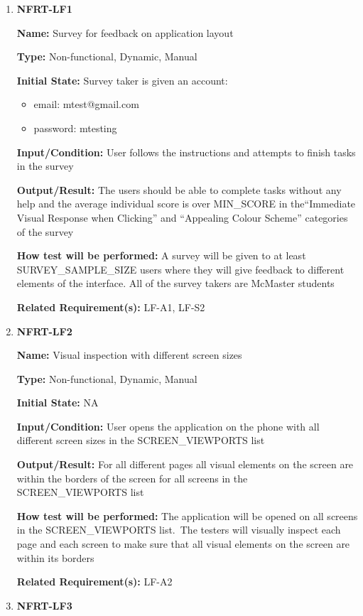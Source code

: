 \documentclass[12pt, titlepage]{article}
\begin{document}
\begin{enumerate}
\item{\textbf{NFRT-LF1}}

\textbf{Name:} Survey for feedback on application layout

\textbf{Type:} Non-functional, Dynamic, Manual
					
\textbf{Initial State:} Survey taker is given an account:
\begin{itemize}
\item email: mtest@gmail.com
\item password: mtesting
\end{itemize}

\textbf{Input/Condition:} User follows the instructions and attempts to finish tasks in the survey 
					
\textbf{Output/Result:} The users should be able to complete tasks without any help and the average individual score is over MIN\_SCORE in the``Immediate Visual Response when Clicking'' and ``Appealing Colour Scheme'' categories of the survey
					
\textbf{How test will be performed:} A survey will be given to at least
SURVEY\_SAMPLE\_SIZE users where they will give feedback to different elements of the interface. All of the survey takers are McMaster students

\textbf{Related Requirement(s):} LF-A1, LF-S2

\item{\textbf{NFRT-LF2}}

\textbf{Name:} Visual inspection with different screen sizes

\textbf{Type:} Non-functional, Dynamic, Manual
					
\textbf{Initial State:} NA
					
\textbf{Input/Condition:} User opens the application on the phone with all different screen sizes in the SCREEN\_VIEWPORTS list

\textbf{Output/Result:} For all different pages all visual elements on the screen are within the borders of the screen for all screens in the SCREEN\_VIEWPORTS list

\textbf{How test will be performed:} The application will be opened on all screens in the SCREEN\_VIEWPORTS list.\
The testers will visually inspect each page and each screen to make sure that all visual elements on the screen are within its borders

\textbf{Related Requirement(s):} LF-A2

\item{\textbf{NFRT-LF3}}


\end{enumerate}
\end{document}
